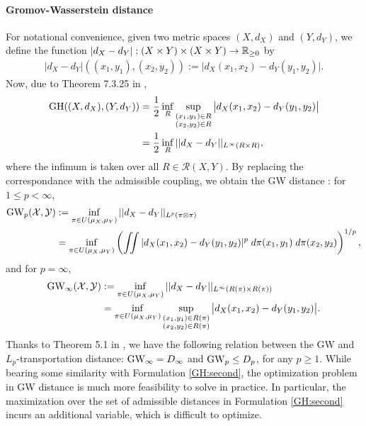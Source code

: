 \paragraph{Gromov-Wasserstein distance}
For notational convenience, given two metric spaces $(X, d_X)$ and $(Y, d_Y)$,
we define the function $|d_X - d_Y|: (X \times Y) \times (X \times Y) \to \mathbb R_{\geq 0}$ by
\begin{align}
    |d_X - d_Y|((x_1, y_1), (x_2, y_2)) := \big\vert d_X(x_1, x_2) - d_Y(y_1, y_2) \big\vert.
\end{align}
Now, due to Theorem 7.3.25 in \citep{Burago01},
\begin{align}
  \text{GH}((X,d_X), (Y,d_Y)) &= \frac{1}{2} \inf_{R}
  \sup_{\substack{(x_1,y_1) \in R \\ (x_2,y_2) \in R}} \big| d_X(x_1, x_2) - d_Y(y_1, y_2) \big| \\
  &= \frac{1}{2} \inf_{R} || d_X - d_Y ||_{L^{\infty}(R \times R)},
\end{align}
where the infimum is taken over all $R \in \mathcal R(X,Y)$. By replacing the correspondance
with the admissible coupling, we obtain the GW distance \citep{Memoli07,Memoli11}:
for $1 \leq p < \infty$,
\begin{align}
    \text{GW}_p(\mathcal X, \mathcal Y) &:= \inf_{ \pi \in U(\mu_X, \mu_Y)} || d_X - d_Y ||_{L^p(\pi \otimes \pi)} \\
    &= \inf_{ \pi \in U(\mu_X, \mu_Y)}
    \left( \iint |d_X(x_1, x_2) - d_Y(y_1, y_2)|^p \;
    d\pi(x_1, y_1) \; d\pi(x_2, y_2) \right)^{1 / p},
\end{align}
and for $p = \infty$,
\begin{align}
    \text{GW}_{\infty}(\mathcal X, \mathcal Y) &:=
    \inf_{ \pi \in U(\mu_X, \mu_Y)} || d_X - d_Y ||_{L^{\infty}(R(\pi) \times R(\pi))} \\
    &= \inf_{ \pi \in U(\mu_X, \mu_Y)}
    \sup_{\substack{(x_1,y_1) \in R(\pi) \\ (x_2,y_2) \in R(\pi)}}
    \big| d_X(x_1, x_2) - d_Y(y_1, y_2) \big|.
\end{align}
Thanks to Theorem 5.1 in \citep{Memoli11b},
we have the following relation between the GW and $L_p$-transportation distance:
$\text{GW}_{\infty} = D_{\infty}$ and $\text{GW}_p \leq D_p$, for any $p \geq 1$.
While bearing some similarity with Formulation \eqref{GH:second},
the optimization problem in GW distance is
much more feasibility to solve in practice. In particular, the maximization over
the set of admissible distances in Formulation \eqref{GH:second} incurs an additional variable,
which is difficult to optimize.

